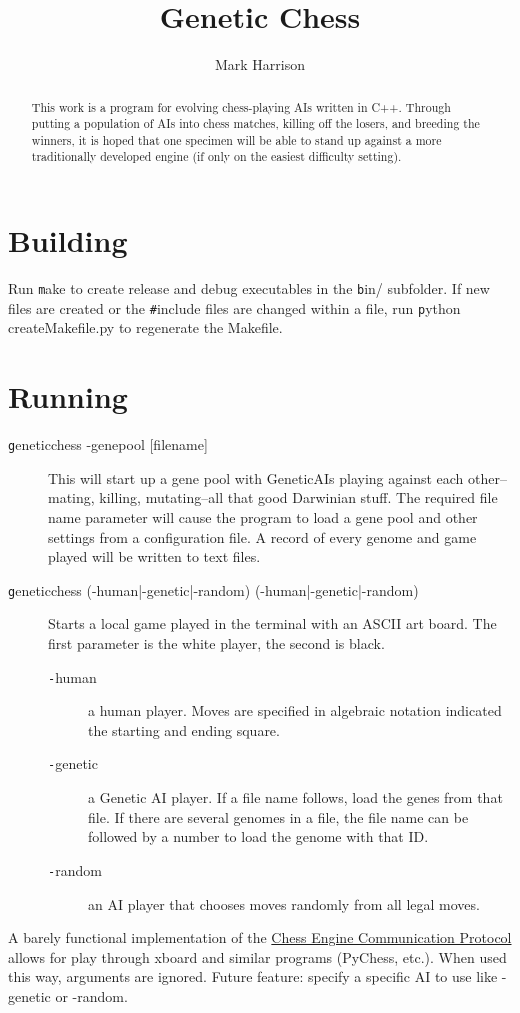 \documentclass[letter]{article}
\title{Genetic Chess}
\author{Mark Harrison}
\newcommand{\cpp}{C{\nobreak +}{\nobreak +}}
\newcommand{\code}[1]{{\texttt #1}}
\renewcommand\_{\textunderscore\allowbreak}
\begin{document}
\maketitle

\begin{abstract}
This work is a program for evolving chess-playing AIs written in \cpp.  Through putting a population of AIs into chess matches, killing off the losers, and breeding the winners, it is hoped that one specimen will be able to stand up against a more traditionally developed engine (if only on the easiest difficulty setting).
\end{abstract}

\tableofcontents{}


\section{Building}
Run \code{make} to create release and debug executables in the \code{bin/} subfolder. If new files are created or the \code{\#include} files are changed within a file, run \code{python create\_Makefile.py} to regenerate the Makefile.


\section{Running}
\begin{description}
	\item[\code{genetic\_chess -genepool [file\_name]}]
This will start up a gene pool with Genetic\_AIs playing against each other--mating, killing, mutating--all that good Darwinian stuff. The required file name parameter will cause the program to load a gene pool and other settings from a configuration file. A record of every genome and game played will be written to text files.

	\item[\code{genetic\_chess (-human|-genetic|-random) (-human|-genetic|-random)}]
Starts a local game played in the terminal with an ASCII art board. The first parameter is the white player, the second is black.
	\begin{description}
		\item[\code{-human}] a human player. Moves are specified in algebraic notation indicated the starting and ending square.
		\item[\code{-genetic}] a Genetic AI player. If a file name follows, load the genes from that file. If there are several genomes in a file, the file name can be followed by a number to load the genome with that ID.
		\item[\code{-random}] an AI player that chooses moves randomly from all legal moves.
	\end{description}
\end{description}
A barely functional implementation of the \href{https://www.gnu.org/software/xboard/engine-intf.html}{Chess Engine Communication Protocol} allows for play through xboard and similar programs (PyChess, etc.). When used this way, arguments are ignored. Future feature: specify a specific AI to use like -genetic or -random.
\end{document}
